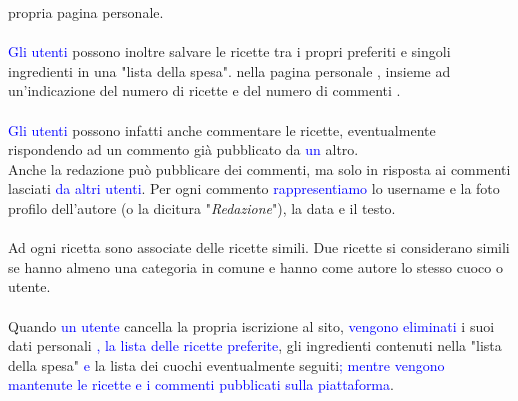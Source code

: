 \documentclass[12pt]{extarticle}
\begin{document}
propria pagina personale.
\\\\
 \textcolor{blue}{Gli utenti} possono inoltre salvare le ricette tra i propri preferiti e singoli ingredienti in una "lista
della spesa".  nella pagina personale ,
insieme ad un'indicazione del numero di ricette e del numero di commenti .
\\\\
 \textcolor{blue}{Gli utenti} possono infatti anche commentare le ricette, eventualmente rispondendo ad un
commento già pubblicato da  \textcolor{blue}{un} altro. 
\\
Anche la redazione può pubblicare dei commenti, ma solo in risposta ai commenti 
lasciati  \textcolor{blue}{da altri utenti}. Per ogni commento  \textcolor{blue}{rappresentiamo} lo
username e la foto profilo dell'autore (o la dicitura "\textit{Redazione}"), la data e il testo.
\\\\
Ad ogni ricetta sono associate delle ricette simili. Due ricette si considerano simili se hanno
almeno una categoria in comune e hanno come autore lo stesso cuoco o utente.
\\\\
Quando  \textcolor{blue}{un utente} cancella la propria iscrizione al sito, \textcolor{blue}{vengono eliminati}  i suoi dati personali \textcolor{blue}{, la lista delle ricette preferite}, gli ingredienti contenuti nella "lista della spesa" \textcolor{blue}{e} la lista
dei cuochi eventualmente seguiti\textcolor{blue}{; mentre vengono mantenute le ricette e i commenti pubblicati sulla piattaforma}. 

\newpage
\end{document}
